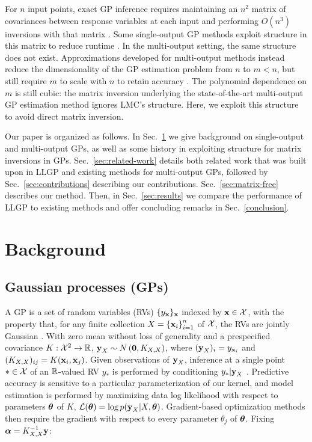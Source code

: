 \documentclass[twoside]{article}
\begin{document}
For $n$ input points, exact GP inference requires maintaining an $n^2$  matrix of covariances between response variables at each input and performing $O(n^3)$ inversions with that matrix \citep{williams1996gaussian}. Some single-output GP methods exploit structure in this matrix to reduce runtime \citep{msgp}. In the multi-output setting, the same structure does not exist. Approximations developed for multi-output methods instead reduce the dimensionality of the GP estimation problem from $n$ to $m<n$, but still require $m$ to scale with $n$ to retain accuracy \citep{nguyen2014collaborative}. The polynomial dependence on $m$ is still cubic: the matrix inversion underlying the state-of-the-art multi-output GP estimation method ignores LMC's structure. Here, we exploit this structure to avoid direct matrix inversion.

Our paper is organized as follows. In Sec.~\ref{sec:background} we give background on single-output and multi-output GPs, as well as some history in exploiting structure for matrix inversions in GPs. Sec.~\ref{sec:related-work} details both related work that was built upon in LLGP and existing methods for multi-output GPs, followed by Sec.~\ref{sec:contributions} describing our contributions. Sec.~\ref{sec:matrix-free} describes our method. Then, in Sec.~\ref{sec:results} we compare the performance of LLGP to existing methods and offer concluding remarks in Sec.~\ref{conclusion}.


\section{Background}
\label{sec:background}

\subsection{Gaussian processes (GPs)}

A GP is a set of random variables (RVs) $\{y_{\textbf{x}}\}_{\textbf{x}}$ indexed by $\textbf{x}\in\mathcal{X}$, with the property that, for any finite collection $X=\left\{ \textbf{x}_i \right\}_{ i=1 }^{ n }$ of $\mathcal{X}$, the RVs are jointly Gaussian \citep{williams1996gaussian}. With zero mean without loss of generality and a prespecified covariance $K:\mathcal{X}^2\rightarrow\mathbb{R}$, $\textbf{y}_X\sim N\left({\textbf{0}, K_{X, X}}\right)$, where $(\textbf{y}_X)_i=y_{\textbf{x}_i}$ and $(K_{X,X})_{ij}=K(\textbf{x}_i,\textbf{x}_j)$. Given observations of $\textbf{y}_X$, inference at a single point $*\in\mathcal{X}$ of an $\mathbb{R}$-valued RV $y_*$ is performed by conditioning $y_*|\textbf{y}_X$ \citep{williams1996gaussian}.
Predictive accuracy is sensitive to a particular parameterization of our kernel, and model estimation is performed by maximizing data log likelihood with respect to parameters ${\boldsymbol\theta}$ of $K$, $\mathcal{L}({\boldsymbol\theta})=\log p(\textbf{y}_{X}|X,{\boldsymbol\theta})$. Gradient-based optimization methods then require the gradient with respect to every parameter $\theta_j$ of ${\boldsymbol\theta}$. Fixing ${\boldsymbol\alpha}=K_{X,X}^{-1}\textbf{y}$:
\end{document}
